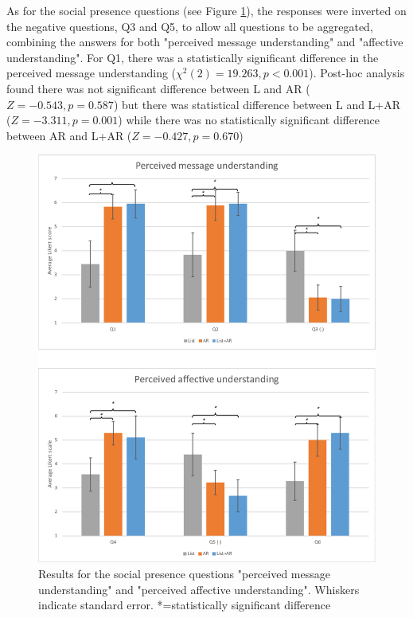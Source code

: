 As for the social presence questions (see Figure \ref{fig:mgia16:social_presence}), the responses were inverted on the negative questions, Q3 and Q5, to allow all questions to be aggregated, combining the answers for both "perceived message understanding" and "affective understanding". 
For Q1, there was a statistically significant difference in the perceived message understanding ($\chi^2(2)=19.263, p<0.001$). Post-hoc analysis found there was not significant difference between L and AR ($Z=-0.543, p=0.587$) but there was statistical difference between L and L+AR ($Z=-3.311, p=0.001$) while there was no statistically significant difference between AR and L+AR ($Z=-0.427, p=0.670$)




\begin{figure}[htb]
  \centering
  \includegraphics[width=.8\linewidth]{images/61-video-mgia16/social-presence.eps}
  \caption{Results for the social presence questions "perceived message understanding" and "perceived affective understanding". Whiskers indicate standard error. *=statistically significant difference}
    \label{fig:mgia16:social_presence}
\end{figure}

